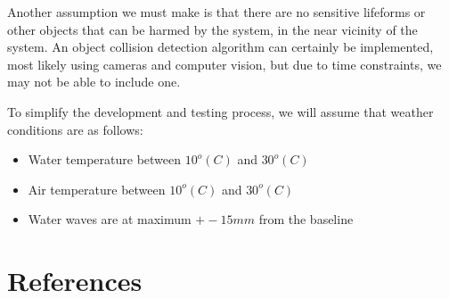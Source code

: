 \documentclass[11pt]{article}
\begin{document}
Another assumption we must make is that there are no sensitive lifeforms or other objects that can be harmed by the system, in the near vicinity of the system. An object collision detection algorithm can certainly be implemented, most likely using cameras and computer vision, but due to time constraints, we may not be able to include one.

To simplify the development and testing process, we will assume that weather conditions are as follows:

\begin{itemize}
    \item Water temperature between $10^o (C)$ and $30^o (C)$
    \item Air temperature between $10^o (C)$ and $30^o (C)$
    \item Water waves are at maximum $+- 15mm$ from the baseline
\end{itemize}

\section{References}
\printbibliography
\end{document}
